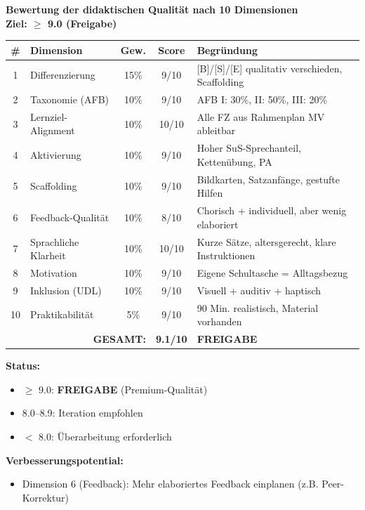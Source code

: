 \documentclass[11pt,a4paper]{article}
\begin{document}
\begin{scorebox}
\textbf{Bewertung der didaktischen Qualität nach 10 Dimensionen}\\
\textbf{Ziel: $\geq$ 9.0 (Freigabe)}

\vspace{1em}
\begin{tabular}{|c|l|c|c|p{4.5cm}|}
\hline
\textbf{\#} & \textbf{Dimension} & \textbf{Gew.} & \textbf{Score} & \textbf{Begründung} \\
\hline
1 & Differenzierung & 15\% & 9/10 & [B]/[S]/[E] qualitativ verschieden, Scaffolding \\
\hline
2 & Taxonomie (AFB) & 10\% & 9/10 & AFB I: 30\%, II: 50\%, III: 20\% \\
\hline
3 & Lernziel-Alignment & 10\% & 10/10 & Alle FZ aus Rahmenplan MV ableitbar \\
\hline
4 & Aktivierung & 10\% & 9/10 & Hoher SuS-Sprechanteil, Kettenübung, PA \\
\hline
5 & Scaffolding & 10\% & 9/10 & Bildkarten, Satzanfänge, gestufte Hilfen \\
\hline
6 & Feedback-Qualität & 10\% & 8/10 & Chorisch + individuell, aber wenig elaboriert \\
\hline
7 & Sprachliche Klarheit & 10\% & 10/10 & Kurze Sätze, altersgerecht, klare Instruktionen \\
\hline
8 & Motivation & 10\% & 9/10 & Eigene Schultasche = Alltagsbezug \\
\hline
9 & Inklusion (UDL) & 10\% & 9/10 & Visuell + auditiv + haptisch \\
\hline
10 & Praktikabilität & 5\% & 9/10 & 90 Min. realistisch, Material vorhanden \\
\hline
\multicolumn{3}{|r|}{\textbf{GESAMT:}} & \textbf{9.1/10} & \textcolor{successgreen}{\textbf{FREIGABE}} \\
\hline
\end{tabular}

\vspace{1em}
\textbf{Status:}
\begin{itemize}
    \item[$\boxtimes$] \textcolor{successgreen}{$\geq$ 9.0: \textbf{FREIGABE} (Premium-Qualität)}
    \item[$\Box$] 8.0--8.9: Iteration empfohlen
    \item[$\Box$] $<$ 8.0: Überarbeitung erforderlich
\end{itemize}

\vspace{0.5em}
\textbf{Verbesserungspotential:}
\begin{itemize}
    \item Dimension 6 (Feedback): Mehr elaboriertes Feedback einplanen (z.B. Peer-Korrektur)
\end{itemize}
\end{scorebox}
\end{document}

